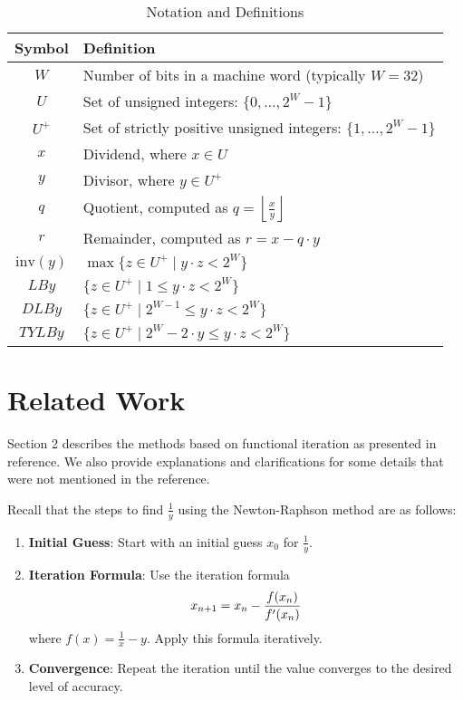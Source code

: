 \documentclass[12pt]{elsarticle}
\begin{document}
\begin{table}[h!]
\centering
\begin{tabular}{|c|l|}
\hline
\textbf{Symbol} & \textbf{Definition} \\ \hline
$ W $ & Number of bits in a machine word (typically $ W = 32 $) \\ \hline
$ U $ & Set of unsigned integers: $ \{0, \ldots, 2^W - 1\} $ \\ \hline
$ U^+ $ & Set of strictly positive unsigned integers: $ \{1, \ldots, 2^W - 1\} $ \\ \hline
$ x $ & Dividend, where $ x \in U $ \\ \hline
$ y $ & Divisor, where $ y \in U^+ $ \\ \hline
$ q $ & Quotient, computed as $ q = \left\lfloor \frac{x}{y} \right\rfloor $ \\ \hline
$ r $ & Remainder, computed as $ r = x - q \cdot y $ \\ \hline
$ \text{inv}(y) $ & $ \max \{ z \in U^+ \mid y \cdot z < 2^W \} $ \\ \hline
$ LBy $ & $ \{ z \in U^+ \mid 1 \leq y \cdot z < 2^W \} $ \\ \hline
$ DLBy $ & $ \{ z \in U^+ \mid 2^{W-1} \leq y \cdot z < 2^W \} $ \\ \hline
$ TYLBy $ & $ \{ z \in U^+ \mid 2^W - 2 \cdot y \leq y \cdot z < 2^W \} $ \\ \hline
\end{tabular}
\caption{Notation and Definitions}
\label{table:notation}
\end{table}



\section{Related Work}
Section 2 describes the methods based on functional iteration as presented in reference\cite{rodeheffer2008software}. We also provide explanations and clarifications for some details that were not mentioned in the reference.

Recall that the steps to find \( \frac{1}{y} \) using the Newton-Raphson method are as follows:
\begin{enumerate}
    \item \textbf{Initial Guess}: Start with an initial guess \( x_0 \) for \( \frac{1}{y} \).
    \item \textbf{Iteration Formula}: Use the iteration formula
    \begin{equation}
        x_{n+1} = x_n - \frac{f(x_n)}{f'(x_n)} \notag
    \end{equation}
    where \( f(x) = \frac{1}{x} - y \). Apply this formula iteratively.
    \item \textbf{Convergence}: Repeat the iteration until the value converges to the desired level of accuracy.
\end{enumerate}
\end{document}
